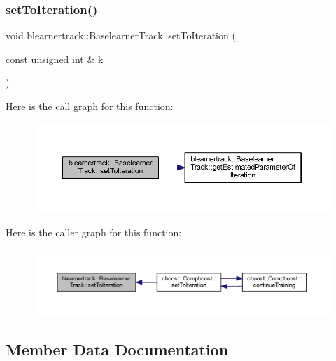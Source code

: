 \subsubsection{\texorpdfstring{set\+To\+Iteration()}{setToIteration()}}
{\footnotesize\ttfamily void blearnertrack\+::\+Baselearner\+Track\+::set\+To\+Iteration (\begin{DoxyParamCaption}\item[{const unsigned int \&}]{k }\end{DoxyParamCaption})}

Here is the call graph for this function\+:
\nopagebreak
\begin{figure}[H]
\begin{center}
\leavevmode
\includegraphics[width=350pt]{classblearnertrack_1_1_baselearner_track_a06f0ac986a158eecddce64e6c7af0750_cgraph}
\end{center}
\end{figure}
Here is the caller graph for this function\+:
\nopagebreak
\begin{figure}[H]
\begin{center}
\leavevmode
\includegraphics[width=350pt]{classblearnertrack_1_1_baselearner_track_a06f0ac986a158eecddce64e6c7af0750_icgraph}
\end{center}
\end{figure}


\subsection{Member Data Documentation}
\mbox{\label{classblearnertrack_1_1_baselearner_track_ad37a3a99c04778146256e50c44f2a292}} 
